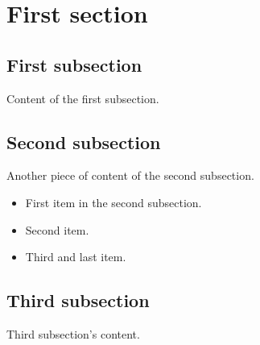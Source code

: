 \documentclass[12pt]{article}
\begin{document}
    \section{First section}
        \subsection{First subsection}
            Content of the first subsection.

        \subsection{Second subsection}
            Another piece of content of the second subsection.
            \begin{itemize}
                \item First item in the second subsection.
                \item Second item.
                \item Third and last item.
            \end{itemize}

        \subsection{Third subsection}
            Third subsection's content.
\end{document}

